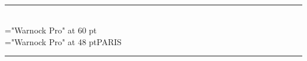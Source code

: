 \documentclass[a4paper,11pt,landscape]{article}
\begin{document}
\pagestyle{empty}
\begin{center}
\mbox{}\\[2.5in]
\hrule\mbox{}
\mbox{}\\[1ex]
\mbox{}
{\font\x="Warnock Pro" at 60 pt\\[0.5cm]}
\mbox{}
{\font\x="Warnock Pro" at 48 pt\x \uppercase{Paris}\\[0.3cm]}
\hrule

\end{center}
\end{document}
